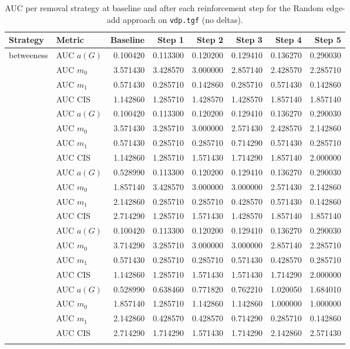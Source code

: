 \begin{table}[htbp]
  \centering
  \caption{AUC per removal strategy at baseline and after each reinforcement step for the Random edge-add approach on \texttt{vdp.tgf} (no deltas).}
  \label{tab:vdp-random_add-auc}
  \begin{tabular}{llrrrrrr}
    \toprule
    \textbf{Strategy} & \textbf{Metric} & \textbf{Baseline} & \textbf{Step 1} & \textbf{Step 2} & \textbf{Step 3} & \textbf{Step 4} & \textbf{Step 5} \\
    \midrule
    \multirow{4}{*}{betweeness} & AUC $a(G)$ & 0.100420 & 0.113300 & 0.120200 & 0.129410 & 0.136270 & 0.290030 \\
    & AUC $m_0$ & 3.571430 & 3.428570 & 3.000000 & 2.857140 & 2.428570 & 2.285710 \\
    & AUC $m_1$ & 0.571430 & 0.285710 & 0.142860 & 0.285710 & 0.571430 & 0.142860 \\
    & AUC CIS & 1.142860 & 1.285710 & 1.428570 & 1.428570 & 1.857140 & 1.857140 \\
    \addlinespace
    \multirow{4}{*}{closeness} & AUC $a(G)$ & 0.100420 & 0.113300 & 0.120200 & 0.129410 & 0.136270 & 0.290030 \\
    & AUC $m_0$ & 3.571430 & 3.285710 & 3.000000 & 2.571430 & 2.428570 & 2.142860 \\
    & AUC $m_1$ & 0.571430 & 0.285710 & 0.285710 & 0.714290 & 0.571430 & 0.285710 \\
    & AUC CIS & 1.142860 & 1.285710 & 1.571430 & 1.714290 & 1.857140 & 2.000000 \\
    \addlinespace
    \multirow{4}{*}{core influence} & AUC $a(G)$ & 0.528990 & 0.113300 & 0.120200 & 0.129410 & 0.136270 & 0.290030 \\
    & AUC $m_0$ & 1.857140 & 3.428570 & 3.000000 & 3.000000 & 2.571430 & 2.142860 \\
    & AUC $m_1$ & 2.142860 & 0.285710 & 0.285710 & 0.428570 & 0.571430 & 0.142860 \\
    & AUC CIS & 2.714290 & 1.285710 & 1.571430 & 1.428570 & 1.857140 & 1.857140 \\
    \addlinespace
    \multirow{4}{*}{degree} & AUC $a(G)$ & 0.100420 & 0.113300 & 0.120200 & 0.129410 & 0.136270 & 0.290030 \\
    & AUC $m_0$ & 3.714290 & 3.285710 & 3.000000 & 3.000000 & 2.857140 & 2.285710 \\
    & AUC $m_1$ & 0.571430 & 0.285710 & 0.285710 & 0.571430 & 0.428570 & 0.285710 \\
    & AUC CIS & 1.142860 & 1.285710 & 1.571430 & 1.571430 & 1.714290 & 2.000000 \\
    \addlinespace
    \multirow{4}{*}{random} & AUC $a(G)$ & 0.528990 & 0.638460 & 0.771820 & 0.762210 & 1.020050 & 1.684010 \\
    & AUC $m_0$ & 1.857140 & 1.285710 & 1.142860 & 1.142860 & 1.000000 & 1.000000 \\
    & AUC $m_1$ & 2.142860 & 0.428570 & 0.428570 & 0.714290 & 0.285710 & 0.142860 \\
    & AUC CIS & 2.714290 & 1.714290 & 1.571430 & 1.714290 & 2.142860 & 2.571430 \\
    \addlinespace
    \bottomrule
  \end{tabular}
\end{table}
